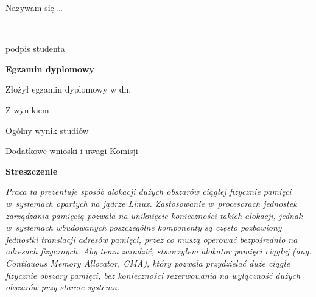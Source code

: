 \begin{titlepage}
    \indent
    Nazywam się \theauthor \dots {}
    \par
    \vspace{2\baselineskip}
    \hfill\parbox{15em}{{\small\dotfill}\\[-.3ex]
    \centerline{\footnotesize podpis studenta}}\par
    \vspace{3\baselineskip}
    \begin{center}
 	{\large\bfseries Egzamin dyplomowy} \par\bigskip\bigskip
    \end{center}
    \par\noindent\vspace{1.5\baselineskip}
    Złożył egzamin dyplomowy w dn. \dotfill
    \par\noindent\vspace{1.5\baselineskip}
    Z wynikiem \dotfill
    \par\noindent\vspace{1.5\baselineskip}
    Ogólny wynik studiów \dotfill
    \par\noindent\vspace{1.5\baselineskip}
    Dodatkowe wnioski i uwagi Komisji \dotfill
    \par\noindent\vspace{1.5\baselineskip}
    \dotfill

    \newpage\thispagestyle{empty}
    \vspace*{2\baselineskip}
    \begin{center}
	{\large\bfseries Streszczenie}\par\bigskip
    \end{center}

    {\itshape Praca ta prezentuje sposób alokacji dużych obszarów
      ciągłej fizycznie pamięci w~systemach opartych na jądrze Linux.
      Zastosowanie w~procesorach jednostek zarządzania pamięcią
      pozwala na uniknięcie konieczności takich alokacji, jednak
      w~systemach wbudowanych poszczególne komponenty są często
      pozbawiony jednostki translacji adresów pamięci, przez co muszą
      operować bezpośrednio na adresach fizycznych.  Aby temu
      zaradzić, stworzyłem alokator pamięci ciągłej (ang. {\it
        Contiguous Memory Allocator}, CMA), który pozwala przydzielać
      duże ciągłe fizycznie obszary pamięci, bez konieczności
      rezerwowania na wyłączność dużych obszarów przy starcie systemu.}
    \vspace*{1\baselineskip}


\end{titlepage}

